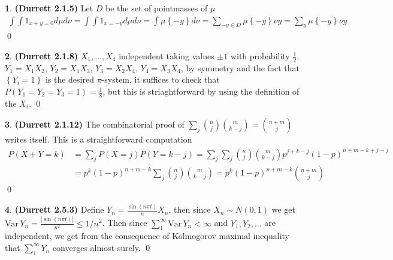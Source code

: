 \documentclass{article}
\theoremstyle{definition}
\newtheorem{pb}{}
\newcommand{\set}[1]{\left\{#1\right\}}
\newcommand{\abs}[1]{\left\vert#1\right\vert}
\newcommand{\var}{\text{Var}}
\begin{document}
    \begin{pb}\textbf{(Durrett 2.1.5)}
        Let \(D\) be the set of pointmasses of \(\mu\)
        \begin{align*}
            \int\int1_{x+y = 0}d \mu d \nu = \int\int1_{x = -y}d \mu d \nu = \int \mu\set{-y} d\nu = \sum_{-y \in D} \mu\set{-y}\nu{y} = \sum_y \mu\set{-y}\nu{y}
        \end{align*} \qed
    \end{pb}
    \begin{pb}\textbf{(Durrett 2.1.8)}
        \(X_1,\hdots,X_4\) independent taking values \(\pm 1\) with probability \(\frac12\). \(Y_1 = X_1X_2\), \(Y_2 = X_1X_3\), \(Y_3 = X_2X_4\), \(Y_4 = X_3X_4\), by symmetry and the fact that \(\set{Y_i = 1}\) is the desired \(\pi\)-system, it suffices to check that \(P(Y_1 = Y_2 = Y_3 = 1) = \frac{1}{8}\), but this is striaghtforward by using the definition of the \(X_i\). \qed
    \end{pb}
    \begin{pb}\textbf{(Durrett 2.1.12)}
        The combinatorial proof of \(\sum_j\binom{n}{j}\binom{m}{k-j} = \binom{n+m}{j}\) writes itself. This is a straightforward computation
        \begin{align*}
            P(X+Y = k) &= \sum_j P(X = j)P(Y = k-j) = \sum_j\sum_j\binom{n}{j}\binom{m}{k-j}p^{j+k-j}(1-p)^{n+m-k+j-j} \\
            &= p^k(1-p)^{n+m-k}\sum_j\binom{n}{j}\binom{m}{k-j} = p^k(1-p)^{n+m-k}\binom{n+m}{j}
        \end{align*} \qed
    \end{pb}
    \begin{pb}\textbf{(Durrett 2.5.3)}
        Define \(Y_n = \frac{\sin(n\pi t)}{n}X_n\), then since \(X_n \sim N(0,1)\) we get \(\var\, Y_n = \frac{\abs{\sin(n\pi t)}}{n^2} \leq 1/n^2\). Then since \(\sum_1^\infty \text{Var}\,Y_n < \infty\) and \(Y_1,Y_2,\hdots\) are independent, we get from the consequence of Kolmogorov maximal inequality that \(\sum_1^\infty Y_n\) converges almost surely. \qed
    \end{pb}
\end{document}
